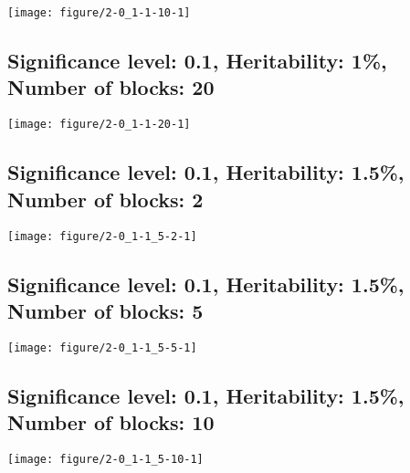 \documentclass[11pt,letter]{article}\usepackage[]{graphicx}\usepackage[]{color}
\makeatletter
\def\maxwidth{ %
  \ifdim\Gin@nat@width>\linewidth
    \linewidth
  \else
    \Gin@nat@width
  \fi
}
\newenvironment{knitrout}{}{} %
\makeatother
\begin{document}
\begin{knitrout}
\color{fgcolor}
\texttt{[image: figure/2-0\_1-1-10-1]} 

\end{knitrout}

\newpage
\subsection{Significance level: 0.1, Heritability: 1\%, Number of blocks: 20}

\begin{knitrout}
\color{fgcolor}
\texttt{[image: figure/2-0\_1-1-20-1]} 

\end{knitrout}

\newpage
\subsection{Significance level: 0.1, Heritability: 1.5\%, Number of blocks: 2}

\begin{knitrout}
\color{fgcolor}
\texttt{[image: figure/2-0\_1-1\_5-2-1]} 

\end{knitrout}

\newpage
\subsection{Significance level: 0.1, Heritability: 1.5\%, Number of blocks: 5}

\begin{knitrout}
\color{fgcolor}
\texttt{[image: figure/2-0\_1-1\_5-5-1]} 

\end{knitrout}

\newpage
\subsection{Significance level: 0.1, Heritability: 1.5\%, Number of blocks: 10}

\begin{knitrout}
\color{fgcolor}
\texttt{[image: figure/2-0\_1-1\_5-10-1]} 

\end{knitrout}
\end{document}
